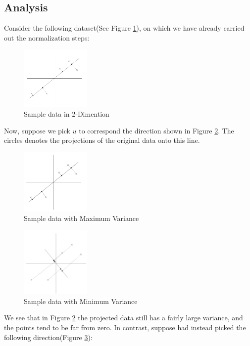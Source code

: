 \documentclass[a4paper]{article}
\begin{document}
\subsection{Analysis}

Consider the following dataset(See Figure \ref{fig:sample}), on which we have already carried out the normalization steps:
\begin{figure}
\centering
\includegraphics[width=0.3\textwidth]{./images/sample.png}
\caption{\label{fig:sample} Sample data in 2-Dimention}
\end{figure}
Now, suppose we pick $u$ to correspond the direction shown in Figure \ref{fig:samplemax}. The circles denotes the projections of the original data onto this line.
\begin{figure}
\centering
\includegraphics[width=0.3\textwidth]{./images/sample_max.png}
\caption{\label{fig:samplemax} Sample data with Maximum Variance}
\end{figure}
\begin{figure}
\centering
\includegraphics[width=0.3\textwidth]{./images/sample_min.png}
\caption{\label{fig:samplemin} Sample data with Minimum Variance}
\end{figure}

We see that in Figure \ref{fig:samplemax} the projected data still has a fairly large variance, and the points tend to be far from zero. In contrast, suppose had instead picked the following direction(Figure \ref{fig:samplemin}):
\end{document}

